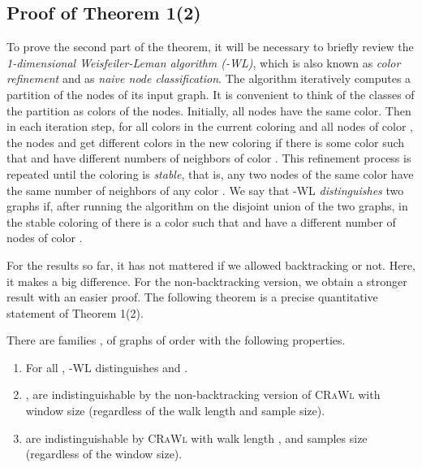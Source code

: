 \documentclass{scrartcl} \usepackage[dvipsnames]{xcolor}
\newcommand{\crawl}{\textsc{CRaWl}}
\begin{document}
\subsection{Proof of Theorem 1(2)}

To prove the second part of the theorem, it will be necessary to
briefly review the \emph{1-dimensional Weisfeiler-Leman algorithm
  (-WL)}, which is also known as \emph{color refinement} and as
\emph{naive node classification}. The algorithm iteratively computes
a partition of the nodes of its input graph. It is convenient to
think of the classes of the partition as colors of the
nodes. Initially, all nodes have the same color. Then in each
iteration step, for all colors  in the current coloring and all
nodes  of color , the nodes  and  get different colors
in the new coloring if there is some color  such that  and 
have different numbers of neighbors of color . This refinement
process is repeated until the coloring is \emph{stable}, that is, any
two nodes  of the same color  have the same number of
neighbors of any color . We say that -WL \emph{distinguishes}
two graphs  if, after running the algorithm on the disjoint
union  of the two graphs, in the stable coloring of
 there is a color  such that  and  have a different
number of nodes of color .


For the results so far, it has not mattered if we allowed backtracking
or not. Here, it makes a big difference. For the non-backtracking
version, we obtain a stronger result with an easier proof. The
following theorem is a precise quantitative statement of Theorem 1(2).

\begin{theorem}\label{theo:a2}
  There are families ,  of graphs of
  order  with the following properties.
  \begin{enumerate}
  \item For all , -WL distinguishes  and .
  \item ,  are indistinguishable by
    the non-backtracking version of \crawl{} with window size 
    (regardless of the walk length and sample size).
  \item   are indistinguishable by
    \crawl{} with walk length ,
    and samples size  (regardless of the window size).
    \end{enumerate}
\end{theorem}
\end{document}
